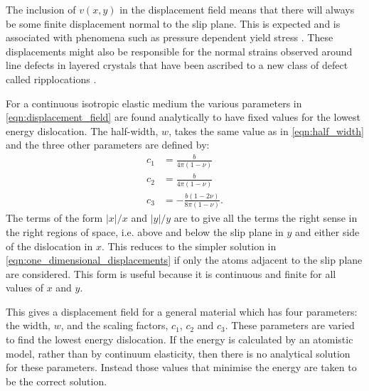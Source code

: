 The inclusion of $v(x,y)$ in the displacement field means that there will always be some finite displacement normal to the slip plane. This is expected and is associated with phenomena such as pressure dependent yield stress \cite{frost1982pressure}. These displacements might also be responsible for the normal strains observed around line defects in layered crystals that have been ascribed to  a new class of defect called ripplocations \cite{Gruber2016}.




For a continuous isotropic elastic medium the various parameters in \autoref{eqn:displacement_field} are found analytically  to have fixed values for the lowest energy dislocation. The half-width, $w$, takes the same value as in \autoref{eqn:half_width} and the three other parameters are defined by:
\begin{subequations}\label{eqn:disloc_params}
\begin{align}
c_1 &= \frac{b}{4\pi{}(1-\nu)} \\
c_2 &= \frac{b}{4\pi{}(1-\nu)} \\
c_3 &= - \frac{b(1-2\nu)}{8\pi(1-\nu)}.
\end{align}
\label{eqn:expressions_for_the_ideal_disloca_parameters}
\end{subequations}
The terms of the form $|x|/x$ and $|y|/y$ are to give all the terms the right sense in the right regions of space, i.e. above and below the slip plane in $y$ and either side of the dislocation in $x$. This reduces to the simpler solution in \autoref{eqn:one_dimensional_displacements} if only the atoms adjacent to the slip plane are considered. This form is useful because it is continuous and finite for all values of $x$ and $y$. 


This gives a displacement field for a general material  which has four parameters: the width, $w$, and the scaling factors, $c_1$, $c_2$ and $c_3$. These parameters are varied to find the lowest energy dislocation. If the energy is calculated by an atomistic model, rather than by continuum elasticity, then there is no analytical solution for these parameters. Instead those values that minimise the energy are taken to be the correct solution.







